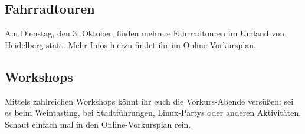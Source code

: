 \subsection{Fahrradtouren}
Am Dienstag, den 3. Oktober, finden mehrere Fahrradtouren im Umland von Heidelberg statt. Mehr Infos hierzu findet ihr im Online-Vorkursplan.

\subsection{Workshops}
Mittels zahlreichen Workshops könnt ihr euch die Vorkurs-Abende versüßen: sei es beim Weintasting, bei Stadtführungen, Linux-Partys oder anderen Aktivitäten. Schaut einfach mal in den Online-Vorkursplan rein.
